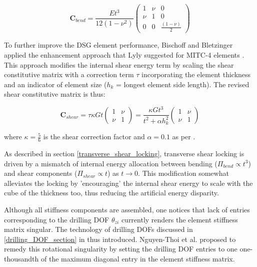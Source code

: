 \begin{equation} 
\mathbf{C}_{bend} =  \frac{E t^3}{12(1-\nu^2)}
\begin{pmatrix}
1 & \nu & 0 \\
\nu & 1 & 0 \\
0 & 0 & \frac{(1-\nu)}{2}
\end{pmatrix}
\label{eqt12}
\end{equation}

To further improve the DSG element performance, Bischoff and Bletzinger \cite{Bis04} \cite{Bis01} applied the enhancement approach that Lyly suggested for MITC-4 elements \cite{Lyl93}. This approach modifies the internal shear energy term by scaling the shear constitutive matrix with a correction term $\tau$ incorporating the element thickness and an indicator of element size ($h_k$ = longest element side length). The revised shear constitutive matrix is thus:

\begin{equation} 
\mathbf{C}_{shear} =  \tau \kappa Gt
\begin{pmatrix}
1 & \nu \\
\nu & 1 
\end{pmatrix}
=
\frac{\kappa G t^3}{t^2 + \alpha h_k^2}
\begin{pmatrix}
1 & \nu \\
\nu & 1 
\end{pmatrix}
\label{eqt14}
\end{equation}

where $\kappa = \frac{5}{6}$ is the shear correction factor and $\alpha = 0.1$ as per \cite{Lyl93}.

As described in section \ref{transverse_shear_locking}, transverse shear locking is driven by a mismatch of internal energy allocation between bending ($\Pi_{bend} \propto t^3$) and shear components ($\Pi_{shear} \propto t$) as $t \rightarrow 0$.  This modification somewhat alleviates the locking by 'encouraging' the internal shear energy to scale with the cube of the thickness too, thus reducing the artificial energy disparity.

Although all stiffness components are assembled, one notices that lack of entries corresponding to the drilling DOF $\theta_{zi}$ currently renders the element stiffness matrix singular. The technology of drilling DOFs discussed in \ref{drilling_DOF_section} in thus introduced. Nguyen-Thoi et al. \cite{Ngu13} proposed to remedy this rotational singularity by setting the drilling DOF entries to one one-thousandth of the maximum diagonal entry in the element stiffness matrix.

